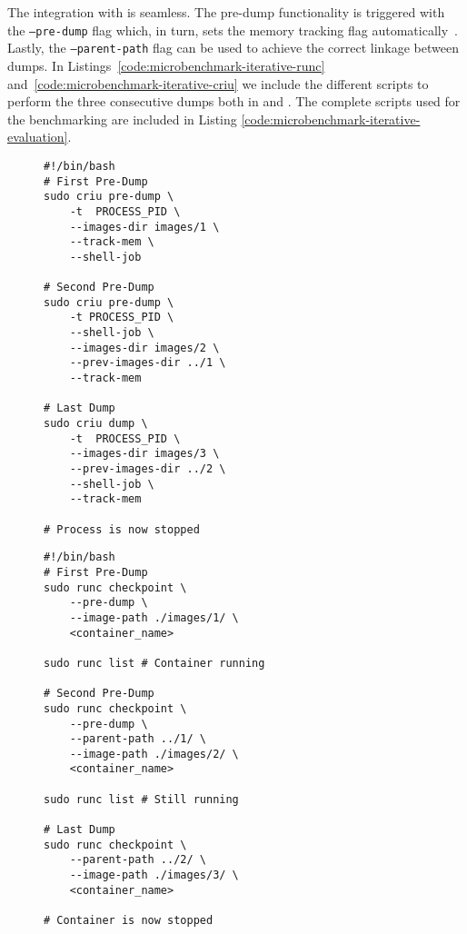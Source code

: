 The integration with \runc is seamless.
The pre-dump functionality is triggered with the \texttt{--pre-dump} flag
which, in turn, sets the memory tracking flag
automatically~\cite{runc-memtrack}.
Lastly, the \texttt{--parent-path} flag can be used to achieve the correct
linkage between dumps.
In Listings~\ref{code:microbenchmark-iterative-runc}
and~\ref{code:microbenchmark-iterative-criu} we include the different scripts
to perform the three consecutive dumps both in \criu and \runc.
The complete scripts used for the benchmarking are included in Listing
\ref{code:microbenchmark-iterative-evaluation}.
\begin{figure}[h!]
    \begin{minipage}{.45\textwidth}
        \begin{lstlisting}[style=Bash,caption={Scripts to perform two pre-dumps and a dump of a running process using \criu.},label={code:microbenchmark-iterative-runc}]
#!/bin/bash
# First Pre-Dump
sudo criu pre-dump \
    -t  PROCESS_PID \
    --images-dir images/1 \
    --track-mem \
    --shell-job 

# Second Pre-Dump
sudo criu pre-dump \
    -t PROCESS_PID \
    --shell-job \
    --images-dir images/2 \
    --prev-images-dir ../1 \
    --track-mem

# Last Dump
sudo criu dump \
    -t  PROCESS_PID \
    --images-dir images/3 \
    --prev-images-dir ../2 \
    --shell-job \
    --track-mem

# Process is now stopped
\end{lstlisting}
    \end{minipage}\hfill
    \begin{minipage}{.45\textwidth}
        \begin{lstlisting}[style=Bash,caption={Scripts to perform two pre-dumps and a dump of a running container using \runc.},label={code:microbenchmark-iterative-criu}]
#!/bin/bash
# First Pre-Dump
sudo runc checkpoint \
    --pre-dump \
    --image-path ./images/1/ \
    <container_name>

sudo runc list # Container running

# Second Pre-Dump
sudo runc checkpoint \
    --pre-dump \
    --parent-path ../1/ \
    --image-path ./images/2/ \
    <container_name>

sudo runc list # Still running

# Last Dump
sudo runc checkpoint \
    --parent-path ../2/ \
    --image-path ./images/3/ \
    <container_name>

# Container is now stopped
\end{lstlisting}
    \end{minipage}
\end{figure}

